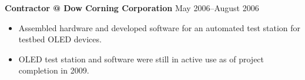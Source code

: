 \documentclass[11pt]{article}
\makeatletter
\newcommand{\jobitem}[4]{
    \vspace{2pt}

    \textbf{#1 @ #2} \hfill #3 %

    \vspace{-8pt}
}
\makeatother
\begin{document}

\vspace{-6pt}
\jobitem{Contractor}{Dow Corning Corporation}{May 2006--August 2006}{Midland, MI}

\begin{itemize}\setlength{\itemsep}{0cm}
  \setlength{\parskip}{0cm}
\item Assembled hardware and developed software for an automated test station for testbed OLED devices. 
\item OLED test station and software were still in active use as of project completion in 2009.
\end{itemize}
%
\end{document}
